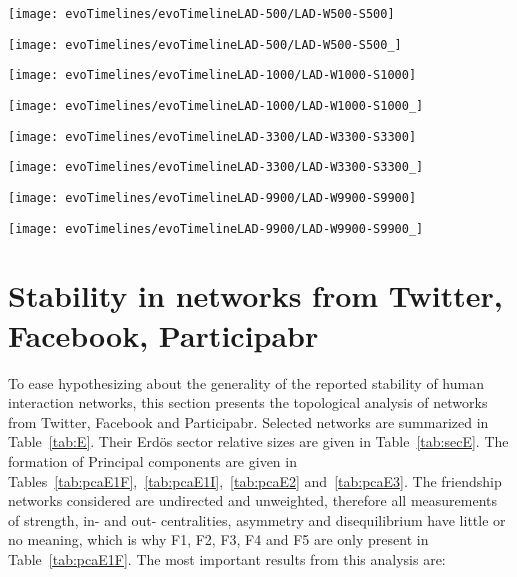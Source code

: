 \begin{figure*}
   \centering
        \texttt{[image: evoTimelines/evoTimelineLAD-500/LAD-W500-S500]}
\end{figure*}
\begin{figure*}
   \centering
        \texttt{[image: evoTimelines/evoTimelineLAD-500/LAD-W500-S500\_]}
\end{figure*}

\begin{figure*}
   \centering
        \texttt{[image: evoTimelines/evoTimelineLAD-1000/LAD-W1000-S1000]}
\end{figure*}
\begin{figure*}
   \centering
        \texttt{[image: evoTimelines/evoTimelineLAD-1000/LAD-W1000-S1000\_]}
\end{figure*}

\begin{figure*}
   \centering
        \texttt{[image: evoTimelines/evoTimelineLAD-3300/LAD-W3300-S3300]}
\end{figure*}
\begin{figure*}
   \centering
        \texttt{[image: evoTimelines/evoTimelineLAD-3300/LAD-W3300-S3300\_]}
\end{figure*}

\begin{figure*}
   \centering
   \texttt{[image: evoTimelines/evoTimelineLAD-9900/LAD-W9900-S9900]}
\end{figure*}
\begin{figure*}
   \centering
        \texttt{[image: evoTimelines/evoTimelineLAD-9900/LAD-W9900-S9900\_]}
\end{figure*}


\FloatBarrier
\section{Stability in networks from Twitter, Facebook, Participabr}\label{si:ext}
To ease hypothesizing about the generality of the reported stability of human interaction networks,
this section presents the topological analysis of
networks from Twitter, Facebook and Participabr.
Selected networks are summarized in
Table~\ref{tab:E}. Their Erd\"os sector relative sizes are given in Table~\ref{tab:secE}. The formation of Principal components
are given in
Tables~\ref{tab:pcaE1F},~\ref{tab:pcaE1I},~\ref{tab:pcaE2} and~\ref{tab:pcaE3}. The friendship networks considered are undirected and unweighted, therefore all measurements of strength, in- and out- centralities, asymmetry and disequilibrium have little or no meaning, which is why F1, F2, F3, F4 and F5 are only present in Table~\ref{tab:pcaE1F}.
The most important results from this analysis are:

